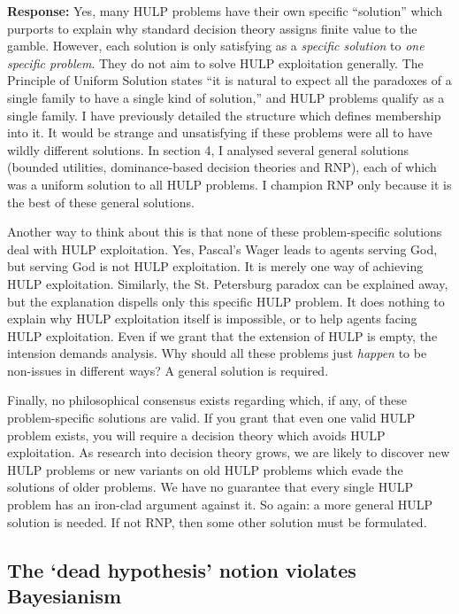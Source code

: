 \documentclass{article}
\begin{document}
\textbf{Response:} Yes, many HULP problems have their own specific ``solution'' which purports to explain why standard decision theory assigns finite value to the gamble. However, each solution is only satisfying as a \textit{specific solution} to \textit{one specific problem}. They do not aim to solve HULP exploitation generally. The Principle of Uniform Solution states ``it is natural to expect all the paradoxes of a single family to have a single kind of solution,'' \citep[pg. 32]{priest1994structure} and HULP problems qualify as a single family. I have previously detailed the structure which defines membership into it. It would be strange and unsatisfying if these problems were all to have wildly different solutions. In section 4, I analysed several general solutions (bounded utilities, dominance-based decision theories and RNP), each of which was a uniform solution to all HULP problems. I champion RNP only because it is the best of these general solutions. 

Another way to think about this is that none of these problem-specific solutions deal with HULP exploitation. Yes, Pascal's Wager leads to agents serving God, but serving God is not HULP exploitation. It is merely one way of achieving HULP exploitation. Similarly, the St. Petersburg paradox can be explained away, but the explanation dispells only this specific HULP problem. It does nothing to explain why HULP exploitation itself is impossible, or to help agents facing HULP exploitation. Even if we grant that the extension of HULP is empty, the intension demands analysis. Why should all these problems just \textit{happen} to be non-issues in different ways? A general solution is required. 

Finally, no philosophical consensus exists regarding which, if any, of these problem-specific solutions are valid. If you grant that even one valid HULP problem exists, you will require a decision theory which avoids HULP exploitation. As research into decision theory grows, we are likely to discover new HULP problems \textemdash{} or new variants on old HULP problems \textemdash{} which evade the solutions of older problems. We have no guarantee that every single HULP problem has an iron-clad argument against it. So again: a more general HULP solution is needed. If not RNP, then some other solution must be formulated.

\subsection{The `dead hypothesis' notion violates Bayesianism} 
\end{document}
